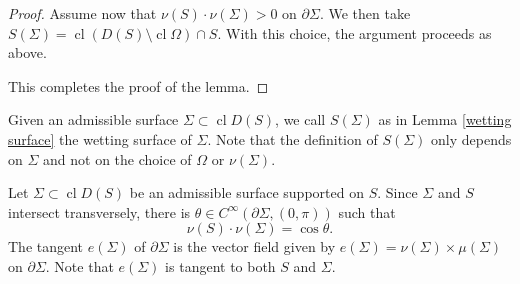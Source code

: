 \documentclass[11pt]{amsart}
\begin{document}
\begin{appendices}
\begin{proof}
Assume now that $\nu(S)\cdot \nu(\Sigma)>0$ on $\partial \Sigma$. We then take $S(\Sigma)=\operatorname{cl}(D(S)\setminus \operatorname{cl}\Omega)\cap S$. With this choice, the argument proceeds as above.

This completes the proof of the lemma.
	\end{proof}
	Given an admissible surface $\Sigma \subset \operatorname{cl}D(S)$, we call $S(\Sigma)$ as in Lemma \ref{wetting surface} the wetting surface of $\Sigma$. Note that the definition of $S(\Sigma)$ only depends on $\Sigma$ and not on the choice of $\Omega$ or $\nu(\Sigma)$.  
	
	
	Let $\Sigma\subset \operatorname{cl}D(S)$ be an admissible surface supported on $S$. Since $\Sigma$ and $S$ intersect transversely, there is $\theta\in C^\infty(\partial\Sigma,(0,\pi))$ such that 
	$$
	\nu(S)\cdot\nu(\Sigma)=\cos\theta.
	$$
	 	The tangent $e( \Sigma)$  of $\partial \Sigma$ is the vector field  given by $e( \Sigma)=\nu(\Sigma)\times \mu(\Sigma)$ on $\partial \Sigma$.
	Note that $e( \Sigma)$ is tangent to both $S$ and $\Sigma$.
	

\end{appendices}
\end{document}
